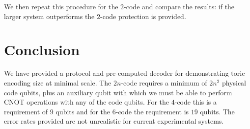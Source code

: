 We then repeat this procedure for the $2$-code and compare the results: if the larger system outperforms the $2$-code protection is provided. 


\section{Conclusion}

We have provided a protocol and pre-computed decoder for demonstrating toric encoding size at minimal scale. The $2n$-code requires a minimum of $2n^2$ physical code qubits, plus an auxiliary qubit with which we must be able to perform CNOT operations with any of the code qubits. For the $4$-code this is a requirement of $9$ qubits and for the $6$-code the requirement is $19$ qubits. The error rates provided are not unrealistic for current experimental systems. 

